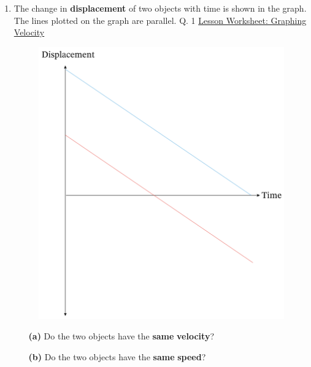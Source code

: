 \documentclass[A4,12pt]{article}
\begin{document}
\begin{enumerate}[label=\bfseries (\arabic*)]
\item The change in \textbf{displacement} of two objects with time is shown in the graph. The lines plotted on the graph are parallel. \cite{Nagwa} Q. 1 \href{https://www.nagwa.com/en/worksheets/715142164735/}{Lesson Worksheet: Graphing Velocity}
%
\begin{figure}[H]
    \centering
    \includegraphics[scale=0.7]{Nagwa_Q1_disp.png}
\end{figure}
%
\begin{itemize}
    \item[\bf (a)] Do the two objects have the \textbf{same} \textbf{velocity}?
    
    \item[\bf (b)] Do the two objects have the \textbf{same} \textbf{speed}?
    

\end{itemize}
\end{enumerate}
\end{document}
